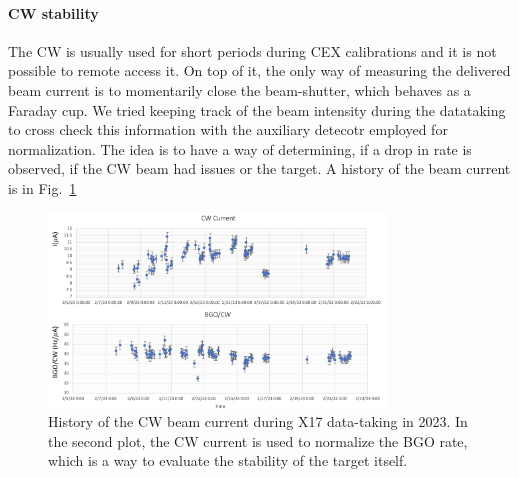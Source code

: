 \begin{refsection}
        \paragraph{CW stability} The CW is usually used for short periods during CEX calibrations and it is not possible to remote access it.
        On top of it, the only way of measuring the delivered beam current is to momentarily close the beam-shutter, which behaves as a Faraday cup.
        We tried keeping track of the beam intensity during the datataking to cross check this information with the auxiliary detecotr employed for normalization.
        The idea is to have a way of determining, if a drop in rate is observed, if the CW beam had issues or the target.
        A history of the beam current is in Fig.~\ref{fig:X17:CW:current}
        \begin{figure}
            \centering
            \includegraphics[width = 0.8\textwidth]{Figures/X17/X17_Feb2023/Stability.pdf}
            \caption{History of the CW beam current during X17 data-taking in 2023. In the second plot, the CW current is used to normalize the BGO rate, which is a way to evaluate the stability of the target itself.}
            \label{fig:X17:CW:current}
        \end{figure}


\end{refsection}
